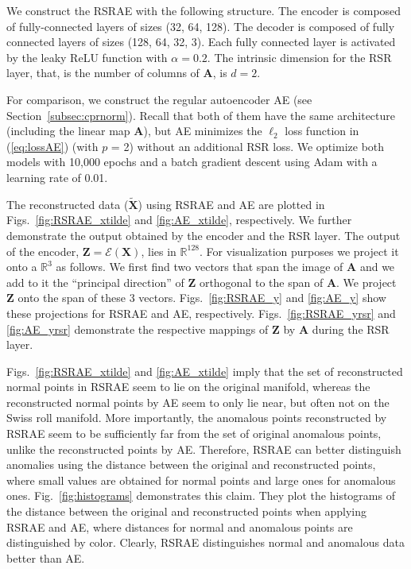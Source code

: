 \documentclass{article} \usepackage{iclr2020_conference,times}
\def\Secref#1{Section~\ref{#1}}
\def\eqref#1{(\ref{#1})}
\def\rmA{{\mathbf{A}}}
\def\rmX{{\mathbf{X}}}
\def\rmZ{{\mathbf{Z}}}
\newcommand{\R}{\mathbb{R}}
\begin{document}
We construct the RSRAE with the following structure. The encoder is composed of fully-connected layers of sizes (32, 64, 128). The decoder is composed of fully connected layers of sizes (128, 64, 32, 3). Each fully connected layer is activated by the leaky ReLU function with $\alpha=0.2$. The intrinsic dimension for the RSR layer, that, is the number of columns of $\rmA$, is $d=2$.

For comparison, we construct the regular autoencoder AE (see \Secref{subsec:cprnorm}). Recall that both of them have the same architecture (including the linear map $\rmA$), but AE minimizes the $\ell_2$ loss function in \eqref{eq:lossAE} (with $p$ = 2) without an additional RSR loss. We optimize both models with 10,000 epochs and a batch gradient descent using Adam \citep{kingma2014adam} with a learning rate of 0.01. 

The reconstructed data ($\tilde{\rmX}$) using  
RSRAE and AE are plotted in Figs.~\ref{fig:RSRAE_xtilde} and \ref{fig:AE_xtilde}, respectively. 
We further demonstrate the output obtained by the encoder and the RSR layer. The output of the encoder, $\rmZ = \mathscr{E}(\rmX)$, lies in $\R^{128}$. For visualization purposes we project it onto a $\R^3$ as follows. We first find two vectors that span the image of $\rmA$  and we add to it the ``principal direction'' of $\rmZ$ orthogonal to the span of $\rmA$. We project $\rmZ$ onto the span of these 3 vectors.  Figs.~\ref{fig:RSRAE_y} and \ref{fig:AE_y} show these projections for RSRAE and AE, respectively. Figs.~\ref{fig:RSRAE_yrsr} and \ref{fig:AE_yrsr} demonstrate the respective mappings of $\rmZ$ by $\rmA$ during the RSR layer.  

Figs.~\ref{fig:RSRAE_xtilde} and \ref{fig:AE_xtilde} imply that the set of reconstructed normal points in RSRAE seem to lie on the original manifold, whereas the reconstructed normal points by AE seem to only lie near, but often not on the Swiss roll manifold. More importantly, the anomalous points reconstructed by RSRAE seem to be sufficiently far from the set of original anomalous points, unlike the reconstructed points by AE. Therefore, RSRAE can better distinguish anomalies using the distance between the original and reconstructed points, where small values are obtained for normal points and large ones for anomalous ones. 
Fig.~\ref{fig:histograms} demonstrates this claim. They plot the histograms of the distance 
between the original and reconstructed points when applying RSRAE and AE, where distances for normal and anomalous points are distinguished by color. Clearly, RSRAE distinguishes normal and anomalous data better than AE. 
\end{document}
